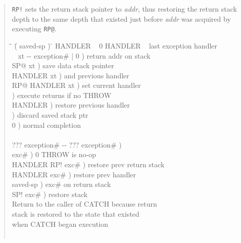 \begin{info}
\begin{quote}
\texttt{RP!} 
	sets the return stack pointer to \emph{addr}, thus restoring the
	return stack depth to the same depth that existed just before
	\emph{addr} was acquired by executing \texttt{RP@}.

	\ttfamily
	\begin{tabbing}
	\tab \= \tab \= \hspace{7em} \= ( saved-sp ) \= \kill
	 HANDLER ~ 0 HANDLER \word{!} ~  last exception handler \\[\parskip]

	\+ \word{:}  ~  xt -{}- exception\# | 0 )  return addr on stack \\
		SP@ 				\>\>  xt )	\>  save data stack pointer \\
		HANDLER  	\>\>  xt )	\>  and previous handler \\
		RP@ HANDLER \word{!}		\>\>  xt )	\>  set current handler \\
						\>\>  )		\>  execute returns if no THROW \\
		 HANDLER \word{!}	\>\>  )		\>  restore previous handler \\
		 		\>\>  )		\>  discard saved stack ptr \\
								\>\>  0 )	\>  normal completion \\
	\word{;} \\[\parskip]

	\+ \word{:}   ??? exception\# -{}- ??? exception\# ) \\
		\+  			\>\>  exc\# )	\>  0 THROW is no-op \\
			HANDLER  RP!			\>  exc\# ) \>  restore prev return stack \\
			 HANDLER \word{!}		\>  exc\# ) \>  restore prev handler \\
			   \>  saved-sp ) \>  exc\# on return stack \\
			SP!  		\>  exc\# ) 	\> \word{bs} restore stack \\
			 Return to the caller of CATCH because return \\
			 stack is restored to the state that existed \\
		\-	 when CATCH began execution \\
	\-  \\
	\word{;}
	\end{tabbing}
\end{quote}


\end{info}
